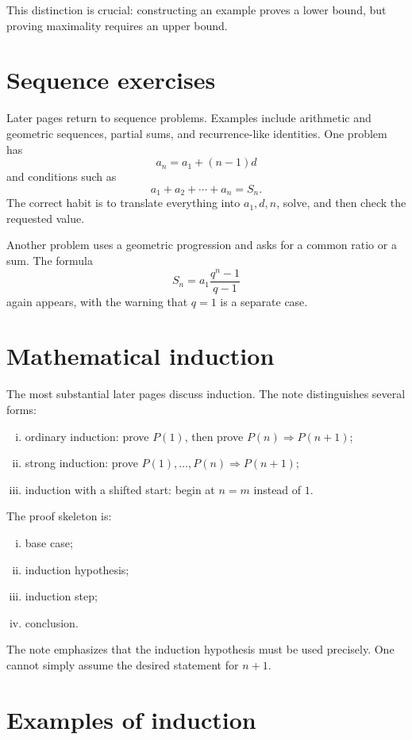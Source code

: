 This distinction is crucial: constructing an example proves a lower bound, but proving maximality requires an upper bound.

\section{Sequence exercises}

Later pages return to sequence problems.  Examples include arithmetic and geometric sequences, partial sums, and recurrence-like identities.  One problem has
\[
  a_n=a_1+(n-1)d
\]
and conditions such as
\[
  a_1+a_2+\cdots+a_n=S_n.
\]
The correct habit is to translate everything into \(a_1,d,n\), solve, and then check the requested value.

Another problem uses a geometric progression and asks for a common ratio or a sum.  The formula
\[
  S_n=a_1\frac{q^n-1}{q-1}
\]
again appears, with the warning that \(q=1\) is a separate case.

\section{Mathematical induction}

The most substantial later pages discuss induction.  The note distinguishes several forms:
\begin{enumerate}[(i)]
  \item ordinary induction: prove \(P(1)\), then prove \(P(n)\Rightarrow P(n+1)\);
  \item strong induction: prove \(P(1),\ldots,P(n)\Rightarrow P(n+1)\);
  \item induction with a shifted start: begin at \(n=m\) instead of \(1\).

\end{enumerate}

The proof skeleton is:
\begin{enumerate}[(i)]
  \item base case;
  \item induction hypothesis;
  \item induction step;
  \item conclusion.

\end{enumerate}
The note emphasizes that the induction hypothesis must be used precisely.  One cannot simply assume the desired statement for \(n+1\).

\section{Examples of induction}

